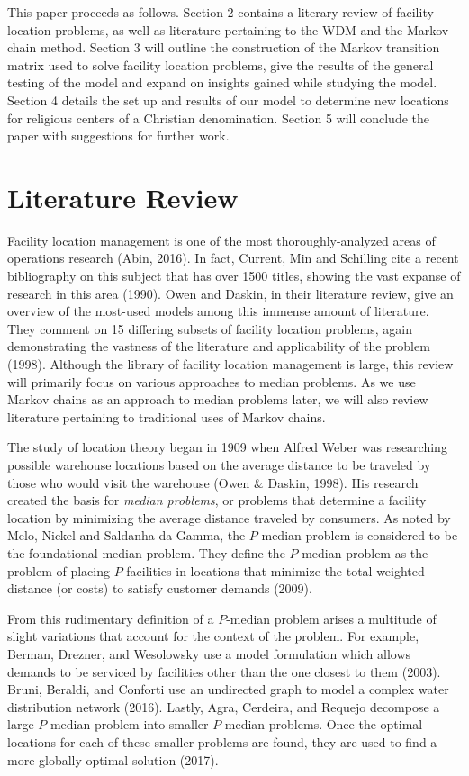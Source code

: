 \documentclass[twoside,twocolumn]{article}
\begin{document}
This paper proceeds as follows.
Section 2 contains a literary review of facility location problems, as well as literature pertaining to the WDM and the Markov chain method.
Section 3 will outline the construction of the Markov transition matrix used to solve facility location problems, give the results of the general testing of the model and expand on insights gained while studying the model.
Section 4 details the set up and results of our model to determine new locations for religious centers of a Christian denomination.
Section 5 will conclude the paper with suggestions for further work.

\section{Literature Review}

Facility location management is one of the most thoroughly-analyzed areas of operations research (Abin, 2016).
In fact, Current, Min and Schilling cite a recent bibliography on this subject that has over 1500 titles, showing the vast expanse of research in this area (1990).
Owen and Daskin, in their literature review, give an overview of the most-used models among this immense amount of literature.
They comment on 15 differing subsets of facility location problems, again demonstrating the vastness of the literature and applicability of the problem (1998).
Although the library of facility location management is large, this review will primarily focus on various approaches to median problems.
As we use Markov chains as an approach to median problems later, we will also review literature pertaining to traditional uses of Markov chains.

The study of location theory began in 1909 when Alfred Weber was researching possible warehouse locations based on the average distance to be traveled by those who would visit the warehouse (Owen \& Daskin, 1998).
His research created the basis for {\em median problems}, or problems that determine a facility location by minimizing the average distance traveled by consumers.
As noted by Melo, Nickel and Saldanha-da-Gamma, the $P$-median problem is considered to be the foundational median problem.
They define the $P$-median problem as the problem of placing $P$ facilities in locations that minimize the total weighted distance (or costs) to satisfy customer demands (2009).

From this rudimentary definition of a $P$-median problem arises a multitude of slight variations that account for the context of the problem.
For example, Berman, Drezner, and Wesolowsky use a model formulation which allows demands to be serviced by facilities other than the one closest to them (2003).
Bruni, Beraldi, and Conforti use an undirected graph to model a complex water distribution network (2016).
Lastly, Agra, Cerdeira, and Requejo decompose a large $P$-median problem into smaller $P$-median problems.
Once the optimal locations for each of these smaller problems are found, they are used to find a more globally optimal solution (2017).
\end{document}
